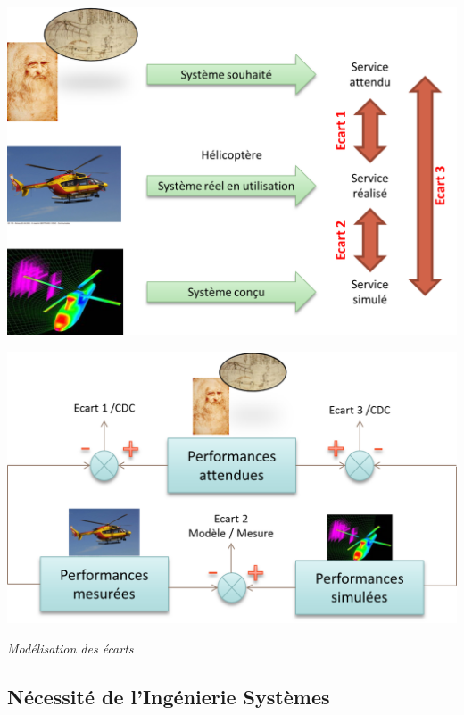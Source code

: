 \documentclass[11pt,oneside]{article}
\begin{document}
\begin{center}
\begin{minipage}[c]{.47\linewidth}
\begin{center}
\includegraphics[width=\textwidth]{png/ecarts1}
\end{center}
\end{minipage}\hfill
\begin{minipage}[c]{.47\linewidth}
\begin{center}
\includegraphics[width=\textwidth]{png/ecarts2}
\end{center}
\end{minipage}

\textit{Modélisation des écarts}
\end{center}

\subsection{Nécessité de l'Ingénierie Systèmes}
\end{document}
